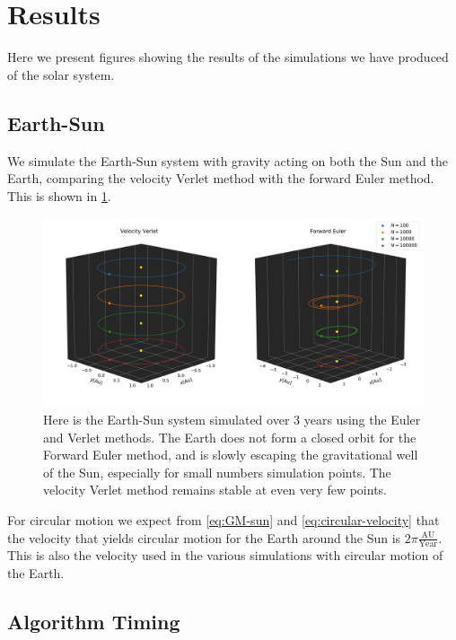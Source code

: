 \documentclass[../main.tex]{subfiles}
\begin{document}
\section{Results}\label{sec:results}

Here we present figures showing the results of the simulations we have produced of the solar system. 

\subsection{Earth-Sun}

We simulate the Earth-Sun system with gravity acting on both the Sun and the Earth, comparing the velocity Verlet method with the forward Euler method. This is shown in \cref{fig:earth-sun-verlet-vs-euler}.

\begin{figure}[htb!]
    \centering
    \includegraphics[trim=2cm 0.cm 0.cm 0.cm, clip,width=\textwidth]{../figures/stability.pdf}
    \caption{Here is the Earth-Sun system simulated over 3 years using the Euler and Verlet methods. The Earth does not form a closed orbit for the Forward Euler method, and is slowly escaping the gravitational well of the Sun, especially for small numbers simulation points. The velocity Verlet method remains stable at even very few points.}
    \label{fig:earth-sun-verlet-vs-euler}
\end{figure}

For circular motion we expect from \cref{eq:GM-sun} and \cref{eq:circular-velocity} that the velocity that yields circular motion for the Earth around the Sun is $2 \pi \frac{\text{AU}}{\text{Year}}$. This is also the velocity used in the various simulations with circular motion of the Earth.

\subsection{Algorithm Timing}
\end{document}
